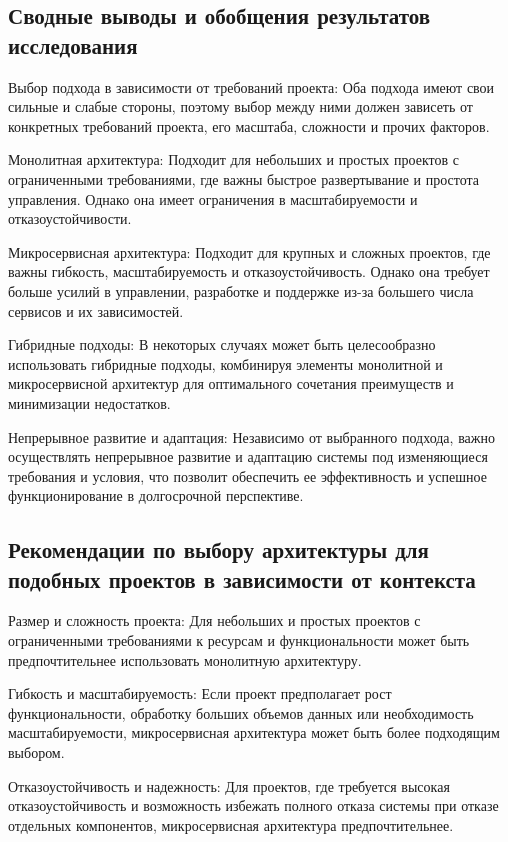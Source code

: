 
\subsection*{Сводные выводы и обобщения результатов исследования}
    Выбор подхода в зависимости от требований проекта: Оба подхода имеют свои сильные и слабые стороны, поэтому выбор между ними должен зависеть от конкретных требований проекта, его масштаба, сложности и прочих факторов.

    Монолитная архитектура: Подходит для небольших и простых проектов с ограниченными требованиями, где важны быстрое развертывание и простота управления. Однако она имеет ограничения в масштабируемости и отказоустойчивости.

    Микросервисная архитектура: Подходит для крупных и сложных проектов, где важны гибкость, масштабируемость и отказоустойчивость. Однако она требует больше усилий в управлении, разработке и поддержке из-за большего числа сервисов и их зависимостей.

    Гибридные подходы: В некоторых случаях может быть целесообразно использовать гибридные подходы, комбинируя элементы монолитной и микросервисной архитектур для оптимального сочетания преимуществ и минимизации недостатков.

    Непрерывное развитие и адаптация: Независимо от выбранного подхода, важно осуществлять непрерывное развитие и адаптацию системы под изменяющиеся требования и условия, что позволит обеспечить ее эффективность и успешное функционирование в долгосрочной перспективе.



\subsection*{Рекомендации по выбору архитектуры для подобных проектов в зависимости от контекста}

    Размер и сложность проекта: Для небольших и простых проектов с ограниченными требованиями к ресурсам и функциональности может быть предпочтительнее использовать монолитную архитектуру.

    Гибкость и масштабируемость: Если проект предполагает рост функциональности, обработку больших объемов данных или необходимость масштабируемости, микросервисная архитектура может быть более подходящим выбором.

    Отказоустойчивость и надежность: Для проектов, где требуется высокая отказоустойчивость и возможность избежать полного отказа системы при отказе отдельных компонентов, микросервисная архитектура предпочтительнее.


